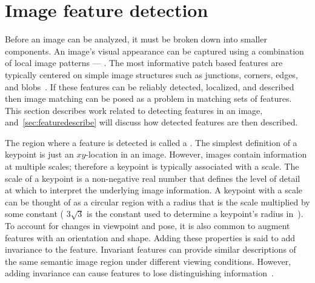 \section{Image feature detection}\label{sec:featuredetect}

    Before an image can be analyzed, it must be broken down into smaller components. An image's visual appearance
    can be captured using a combination of local image patterns --- . The most
    informative patch based features are typically centered on simple image structures such as junctions, corners,
    edges, and blobs~\cite{tuytelaars_local_2007}. If these features can be reliably detected, localized, and
    described then image matching can be posed as a problem in matching sets of features. This section describes
    work related to detecting features in an image, and~\cref{sec:featuredescribe} will discuss how detected
    features are then described.

    The region where a feature is detected is called a . The simplest definition of a keypoint
    is just an $xy$-location in an image. However, images contain information at multiple scales; therefore a
    keypoint is typically associated with a scale. The scale of a keypoint is a non-negative real number that
    defines the level of detail at which to interpret the underlying image information. A keypoint with a scale can
    be thought of as a circular region with a radius that is the scale multiplied by some constant %
    (\eg{} $3\sqrt{3}$ is the constant used to determine a keypoint's radius in~\cite{perdoch_efficient_2009}). To
    account for changes in viewpoint and pose, it is also common to augment features with an orientation and shape.
    Adding these properties is said to add invariance to the feature. Invariant features can provide similar
    descriptions of the same semantic image region under different viewing conditions. However, adding invariance
    can cause features to lose distinguishing information~\cite{mikolajczyk_comparison_2005,
    tuytelaars_local_2007, perdoch_efficient_2009, lowe_distinctive_2004}.

